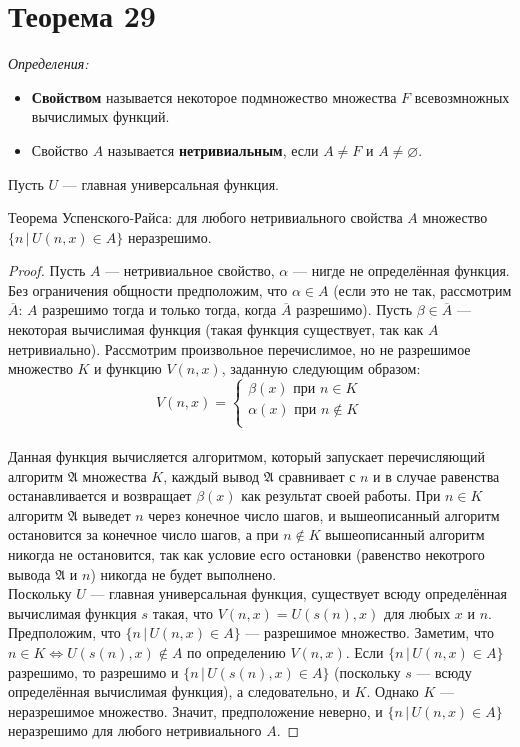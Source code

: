 \documentclass[a4paper,12pt]{article}
\begin{document}
    \section {Теорема 29} {
        \noindent
        \textit{Определения:}
        \begin{itemize}
            \item \textbf{Свойством} называется некоторое подмножество множества $F$ всевозмножных вычислимых функций.
            \item Свойство $A$ называется \textbf{нетривиальным}, если $A\ne F$ и $A\ne\varnothing$.
        \end{itemize}
        Пусть $U$ --- главная универсальная функция.
    }
    \begin{theorem}
        Теорема Успенского-Райса: для любого нетривиального свойства $A$ множество $\{n\, |\, U(n,x) \in A\}$ неразрешимо.
    \end{theorem}
    \begin{proof}
        Пусть $A$ --- нетривиальное свойство, $\alpha$ --- нигде не определённая функция. Без ограничения общности предположим, что $\alpha\in A$ (если это не так, рассмотрим $\overline{A}$: $A$ разрешимо тогда и только тогда, когда $\overline{A}$ разрешимо). Пусть $\beta\in\overline{A}$ --- некоторая вычислимая функция (такая функция существует, так как $A$ нетривиально). Рассмотрим произвольное перечислимое, но не разрешимое множество $K$ и функцию $V(n, x)$, заданную следующим образом:
        \bigskip
        $$ V(n, x) = 
        \begin{cases}
        \beta(x) \text{ при } n \in K\\
        \alpha(x) \text{ при } n \not\in K\\
        \end{cases}
        $$
        \medskip\\
        Данная функция вычисляется алгоритмом, который запускает перечисляющий алгоритм $\mathfrak{A}$ множества $K$, каждый вывод $\mathfrak{A}$ сравнивает с $n$ и в случае равенства останавливается и возвращает $\beta(x)$ как результат своей работы. При $n\in K$ алгоритм $\mathfrak{A}$ выведет $n$ через конечное число шагов, и вышеописанный алгоритм остановится за конечное число шагов, а при $n \not \in K$ вышеописанный алгоритм никогда не остановится, так как условие есго остановки (равенство некотрого вывода $\mathfrak{A}$ и $n$) никогда не будет выполнено.\\
        Поскольку $U$ --- главная универсальная функция, существует всюду определённая вычислимая функция $s$ такая, что $V(n,x)=U(s(n), x)$ для любых $x$ и $n$. Предположим, что $\{n\,|\,U(n, x)\in A\}$ --- разрешимое множество. Заметим, что $n \in K \Leftrightarrow U(s(n), x)\not\in A$ по определению $V(n, x)$. Если $\{n\,|\,U(n, x)\in A\}$ разрешимо, то разрешимо и $\{n\,|\,U(s(n), x)\in A\}$ (поскольку $s$ --- всюду определённая вычислимая функция), а следовательно, и $K$. Однако $K$ --- неразрешимое множество. Значит, предположение неверно, и $\{n\,|\,U(n, x)\in A\}$ неразрешимо для любого нетривиального $A$.
    \end{proof}
    
\end{document}
